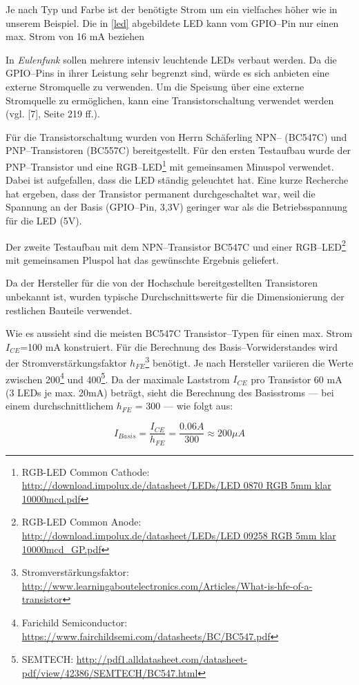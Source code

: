 \documentclass[11pt,ngerman,toc=listof,index=totoc]{scrreprt}
\begin{document}
Je nach Typ und Farbe ist der benötigte Strom um ein vielfaches höher
wie in unserem Beispiel. Die in \ref{led} abgebildete LED kann vom
GPIO--Pin nur einen max. Strom von 16 mA beziehen

In \emph{Eulenfunk} sollen mehrere intensiv leuchtende LEDs verbaut
werden. Da die GPIO--Pins in ihrer Leistung sehr begrenzt sind, würde es
sich anbieten eine externe Stromquelle zu verwenden. Um die Speisung
über eine externe Stromquelle zu ermöglichen, kann eine
Transistorschaltung verwendet werden (vgl. {[}7{]}, Seite 219 ff.).

Für die Transistorschaltung wurden von Herrn Schäferling NPN-- (BC547C)
und PNP--Transistoren (BC557C) bereitgestellt. Für den ersten Testaufbau
wurde der PNP--Transistor und eine RGB--LED\footnote{RGB-LED Common
  Cathode:
  \url{http://download.impolux.de/datasheet/LEDs/LED 0870 RGB 5mm klar 10000mcd.pdf}}
mit gemeinsamen Minuspol verwendet. Dabei ist aufgefallen, dass die LED
ständig geleuchtet hat. Eine kurze Recherche hat ergeben, dass der
Transistor permanent durchgeschaltet war, weil die Spannung an der Basis
(GPIO--Pin, 3,3V) geringer war als die Betriebsspannung für die LED
(5V).

Der zweite Testaufbau mit dem NPN--Transistor BC547C und einer
RGB--LED\footnote{RGB-LED Common Anode:
  \url{http://download.impolux.de/datasheet/LEDs/LED 09258 RGB 5mm klar 10000mcd_GP.pdf}}
mit gemeinsamen Pluspol hat das gewünschte Ergebnis geliefert.

Da der Hersteller für die von der Hochschule bereitgestellten
Transistoren unbekannt ist, wurden typische Durchschnittswerte für die
Dimensionierung der restlichen Bauteile verwendet.

Wie es aussieht sind die meisten BC547C Transistor--Typen für einen max.
Strom \(I_{CE}\)=100 mA konstruiert. Für die Berechnung des
Basis--Vorwiderstandes wird der Stromverstärkungsfaktor
\(h_{FE}\)\footnote{Stromverstärkungsfaktor:
  \url{http://www.learningaboutelectronics.com/Articles/What-is-hfe-of-a-transistor}}
benötigt. Je nach Hersteller variieren die Werte zwischen 200\footnote{Farichild
  Semiconductor:
  \url{https://www.fairchildsemi.com/datasheets/BC/BC547.pdf}} und
400\footnote{SEMTECH:
  \url{http://pdf1.alldatasheet.com/datasheet-pdf/view/42386/SEMTECH/BC547.html}}.
Da der maximale Laststrom \(I_{CE}\) pro Transistor 60 mA (3 LEDs je
max. 20mA) beträgt, sieht die Berechnung des Basisstroms --- bei einem
durchschnittlichem \(h_{FE}\) = 300 --- wie folgt aus:

\[I_{Basis} = \frac{I_{CE}}{h_{FE}} = \frac{0.06A}{300} \approx 200\mu A\]
\end{document}
